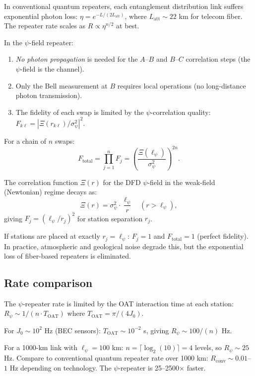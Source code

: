 \documentclass[11pt]{article}
\theoremstyle{definition}
\theoremstyle{remark}
\begin{document}
In conventional quantum repeaters, each entanglement distribution link
suffers exponential photon loss: $\eta = e^{-L/(2L_{\mathrm{att}})}$,
where $L_{\mathrm{att}} \sim 22$ km for telecom fiber. The repeater
rate scales as $R \propto \eta^{n/2}$ at best.

In the $\psi$-field repeater:
\begin{enumerate}
\item \emph{No photon propagation} is needed for the $A$--$B$ and
$B$--$C$ correlation steps (the $\psi$-field is the channel).
\item Only the Bell measurement at $B$ requires local operations
(no long-distance photon transmission).
\item The fidelity of each swap is limited by the $\psi$-correlation
quality: $F_{k\ell} = |\Xi(r_{k\ell})/\sigma_\psi^2|^2$.
\end{enumerate}

For a chain of $n$ swaps:
\begin{equation}
\boxed{F_{\mathrm{total}} = \prod_{j=1}^n F_j
= \left(\frac{\Xi(\ell_\psi)}{\sigma_\psi^2}\right)^{2n}}.
\end{equation}

The correlation function $\Xi(r)$ for the DFD $\psi$-field in the
weak-field (Newtonian) regime decays as:
\begin{equation}
\Xi(r) = \sigma_\psi^2 \cdot \frac{\ell_\psi}{r}
\quad (r > \ell_\psi),
\end{equation}
giving $F_j = (\ell_\psi / r_j)^2$ for station separation $r_j$.

If stations are placed at exactly $r_j = \ell_\psi$:
$F_j = 1$ and $F_{\mathrm{total}} = 1$ (perfect fidelity). In
practice, atmospheric and geological noise degrade this, but the
exponential loss of fiber-based repeaters is eliminated.

\subsection{Rate comparison}

The $\psi$-repeater rate is limited by the OAT interaction time at
each station: $R_\psi \sim 1/(n \cdot T_{\mathrm{OAT}})$ where
$T_{\mathrm{OAT}} = \pi/(4J_0)$.

For $J_0 \sim 10^2$ Hz (BEC sensors): $T_{\mathrm{OAT}} \sim 10^{-2}$ s,
giving $R_\psi \sim 100/(n)$ Hz.

For a 1000-km link with $\ell_\psi = 100$ km: $n = \lceil\log_2(10)\rceil
= 4$ levels, so $R_\psi \sim 25$ Hz. Compare to conventional quantum
repeater rate over 1000 km: $R_{\mathrm{conv}} \sim 0.01$--$1$ Hz
depending on technology. The $\psi$-repeater is 25--2500$\times$ faster.
\end{document}
